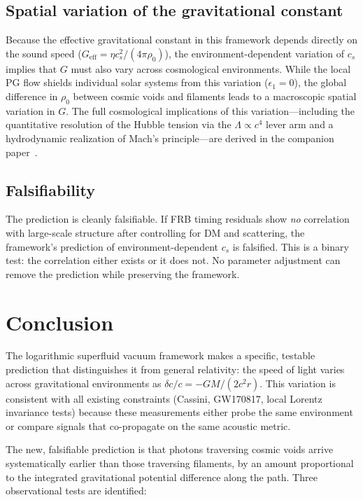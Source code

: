 \documentclass[12pt, a4paper]{article}
\newcommand{\Geff}{G_{\mathrm{eff}}}
\begin{document}
\subsection{Spatial variation of the gravitational
constant}

Because the effective gravitational constant in
this framework depends directly on the sound speed
($\Geff = \eta c_s^2/(4\pi\rho_0)$), the
environment-dependent variation of $c_s$ implies
that $G$ must also vary across cosmological
environments. While the local PG flow shields
individual solar systems from this variation
($\epsilon_1 = 0$), the global difference in
$\rho_0$ between cosmic voids and filaments
leads to a macroscopic spatial variation in $G$.
The full cosmological implications of this
variation---including the quantitative resolution
of the Hubble tension via the
$\Lambda \propto c^4$ lever arm and a
hydrodynamic realization of Mach's
principle---are derived in the companion
paper~\cite{kulangiev_2026_cosmo}.

\subsection{Falsifiability}

The prediction is cleanly falsifiable. If FRB timing
residuals show \emph{no} correlation with large-scale
structure after controlling for DM and scattering,
the framework's prediction of environment-dependent
$c_s$ is falsified. This is a binary test: the
correlation either exists or it does not. No
parameter adjustment can remove the prediction
while preserving the framework.


\section{Conclusion}
\label{sec:conclusion}

The logarithmic superfluid vacuum framework makes a
specific, testable prediction that distinguishes it
from general relativity: the speed of light varies
across gravitational environments as
$\delta c/c = -GM/(2c^2 r)$. This variation is
consistent with all existing constraints (Cassini,
GW170817, local Lorentz invariance tests) because
these measurements either probe the same environment
or compare signals that co-propagate on the same
acoustic metric.

The new, falsifiable prediction is that photons
traversing cosmic voids arrive systematically earlier
than those traversing filaments, by an amount
proportional to the integrated gravitational potential
difference along the path. Three observational tests
are identified:
\end{document}
